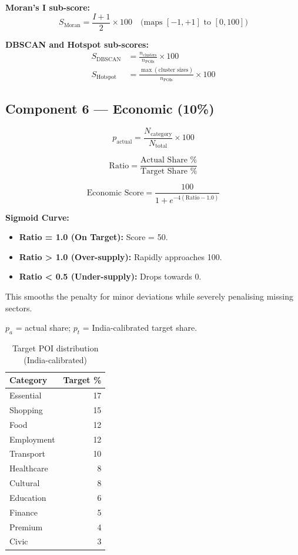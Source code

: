 \documentclass[11pt,a4paper]{article}
\begin{document}
\textbf{Moran's I sub-score:}
\begin{equation}
S_{\text{Moran}} = \frac{I + 1}{2}\times 100
\quad\text{(maps $[-1,+1]$ to $[0,100]$)}
\end{equation}

\textbf{DBSCAN and Hotspot sub-scores:}
\begin{align}
S_{\text{DBSCAN}}  &= \frac{n_{\text{clusters}}}{n_{\text{POIs}}}\times 100 \\[4pt]
S_{\text{Hotspot}} &= \frac{\max(\text{cluster sizes})}{n_{\text{POIs}}}\times 100
\end{align}

\subsection{Component 6 --- Economic (10\%)}

\begin{equation}
p_{\text{actual}} = \frac{N_{\text{category}}}{N_{\text{total}}}\times 100
\end{equation}

\begin{equation}
\text{Ratio} = \frac{\text{Actual Share \%}}{\text{Target Share \%}}
\end{equation}

\begin{equation}
\text{Economic Score} = \frac{100}{1 + e^{-4(\text{Ratio} - 1.0)}}
\end{equation}

\textbf{Sigmoid Curve:} 
\begin{itemize}
    \item \textbf{Ratio = 1.0 (On Target):} Score = 50.
    \item \textbf{Ratio > 1.0 (Over-supply):} Rapidly approaches 100.
    \item \textbf{Ratio < 0.5 (Under-supply):} Drops towards 0.
\end{itemize}
This smooths the penalty for minor deviations while severely penalising missing sectors.

$p_a$ = actual share; $p_t$ = India-calibrated target share.

\begin{table}[H]
\centering
\caption{Target POI distribution (India-calibrated)}
\begin{tabular}{@{}lr@{}}
\toprule
\textbf{Category} & \textbf{Target \%} \\ \midrule
Essential   & 17 \\
Shopping    & 15 \\
Food        & 12 \\
Employment  & 12 \\
Transport   & 10 \\
Healthcare  & 8  \\
Cultural    & 8  \\
Education   & 6  \\
Finance     & 5  \\
Premium     & 4  \\
Civic       & 3  \\ \bottomrule
\end{tabular}
\end{table}
\end{document}
